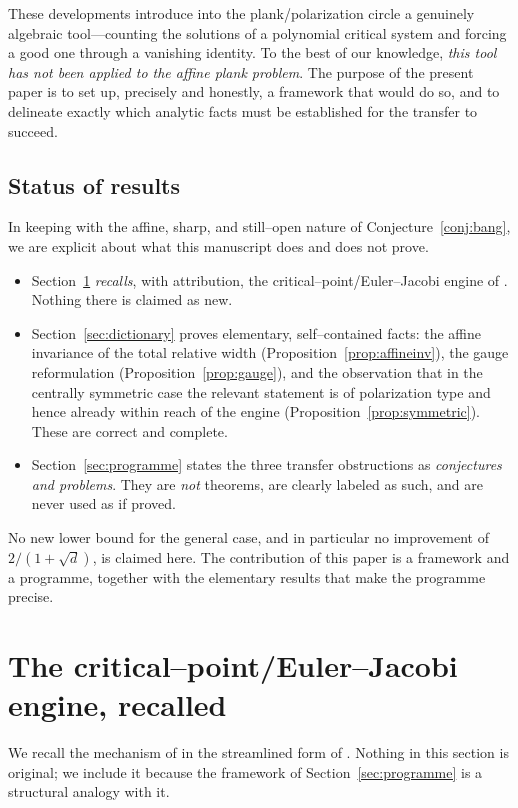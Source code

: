 \documentclass[11pt,reqno]{amsart}
\theoremstyle{plain}
\theoremstyle{definition}
\begin{document}
These developments introduce into the plank/polarization circle a genuinely
algebraic tool---counting the solutions of a polynomial critical system and
forcing a good one through a vanishing identity. To the best of our knowledge,
\emph{this tool has not been applied to the affine plank problem}. The purpose of
the present paper is to set up, precisely and honestly, a framework that would do
so, and to delineate exactly which analytic facts must be established for the
transfer to succeed.

\subsection{Status of results}\label{subsec:status}
In keeping with the affine, sharp, and still--open nature of
Conjecture~\ref{conj:bang}, we are explicit about what this manuscript does and
does not prove.
\begin{itemize}
\item Section~\ref{sec:engine} \emph{recalls}, with attribution, the
critical--point/Euler--Jacobi engine of
\cite{MartinezOrtegaMoreno2026,GalicerOrtegaPinasco2026}. Nothing there is claimed
as new.
\item Section~\ref{sec:dictionary} proves elementary, self--contained facts: the
affine invariance of the total relative width
(Proposition~\ref{prop:affineinv}), the gauge reformulation
(Proposition~\ref{prop:gauge}), and the observation that in the centrally
symmetric case the relevant statement is of polarization type and hence already
within reach of the engine (Proposition~\ref{prop:symmetric}). These are correct
and complete.
\item Section~\ref{sec:programme} states the three transfer obstructions as
\emph{conjectures and problems}. They are \emph{not} theorems, are clearly labeled
as such, and are never used as if proved.
\end{itemize}
No new lower bound for the general case, and in particular no improvement of
$2/(1+\sqrt d)$, is claimed here. The contribution of this paper is a framework
and a programme, together with the elementary results that make the programme
precise.

\section{The critical--point/Euler--Jacobi engine, recalled}\label{sec:engine}

We recall the mechanism of \cite{MartinezOrtegaMoreno2026} in the streamlined form
of \cite{GalicerOrtegaPinasco2026}. Nothing in this section is original; we
include it because the framework of Section~\ref{sec:programme} is a structural
analogy with it.
\end{document}

